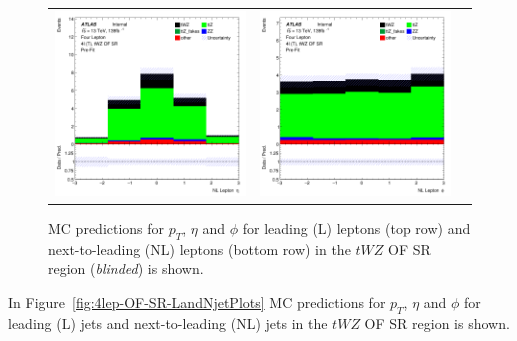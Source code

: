 \begin{figure}[htbp]
\begin{tabular}{ccc}
    \includegraphics[width=.3\textwidth]{figures/PreFitPlots/lep4_tWZ_4T_OF_NL_lepton_eta.png} &
    \includegraphics[width=.3\textwidth]{figures/PreFitPlots/lep4_tWZ_4T_OF_NL_lepton_phi.png} \\

  \end{tabular}
    \caption{MC predictions for $p_{T}$, $\eta$ and $\phi$ for leading (L) leptons (top row) and next-to-leading (NL) leptons (bottom row) in the $tWZ$ OF SR region (\textit{blinded}) is shown.}
  \label{fig:4lep-OF-SR-leptonPlots}
\end{figure}

In Figure~\ref{fig:4lep-OF-SR-LandNjetPlots} MC predictions for $p_{T}$, $\eta$ and $\phi$ for leading (L) jets and next-to-leading (NL) jets in the $tWZ$ OF SR region is shown.

